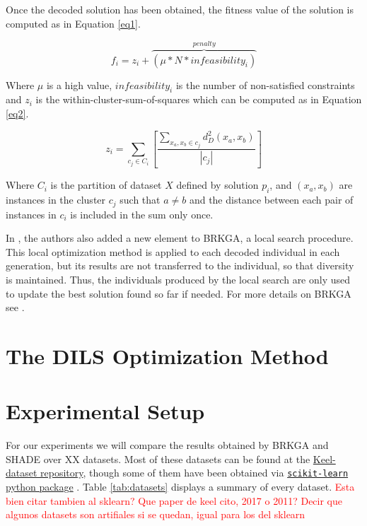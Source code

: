 \documentclass[review]{elsarticle}
\begin{document}
Once the decoded solution has been obtained, the fitness value of the solution is computed as in Equation \eqref{eq1}.

\begin{equation}
f_i = z_i + \overbrace{(\mu * N * {infeasibility}_i)}^{penalty}
\label{eq1}
\end{equation}

Where $\mu$ is a high value, $infeasibility_i$ is the number of non-satisfied constraints and $z_i$ is the within-cluster-sum-of-squares which can be computed as in Equation \eqref{eq2}.

\begin{equation}
z_i = \sum_{c_j \in C_i} \left[ \frac{\sum_{x_a, x_b \in c_j} d_D^2(x_a,x_b)}{|c_j|}\right]
\label{eq2}
\end{equation}

Where $C_i$ is the partition of dataset $X$ defined by solution $p_i$, and $(x_a, x_b)$ are instances in the cluster $c_j$ such that $a \neq b$ and the distance between each pair of instances in $c_i$ is included in the sum only once.

In \cite{de2017comparison}, the authors also added a new element to BRKGA, a local search procedure. This local optimization method is applied to each decoded individual in each generation, but its results are not transferred to the individual, so that diversity is maintained. Thus, the individuals produced by the local search are only used to update the best solution found so far if needed. For more details on BRKGA see \cite{de2017comparison}.

\section{The DILS Optimization Method}

\clearpage

\section{Experimental Setup}

For our experiments we will compare the results obtained by BRKGA and SHADE over XX datasets. Most of these datasets can be found at the \href{https://sci2s.ugr.es/keel/category.php?cat=clas}{Keel-dataset repository}\cite{triguero2017keel}, though some of them have been obtained via
\href{https://scikit-learn.org/stable/datasets/index.html}{\texttt{scikit-learn} python package} \cite{scikit-learn}. Table \ref{tab:datasets} displays a summary of every dataset. \textcolor{red}{Esta bien citar tambien al sklearn? Que paper de keel cito, 2017 o 2011? Decir que algunos datasets son artifiales si se quedan, igual para los del sklearn}
\end{document}
